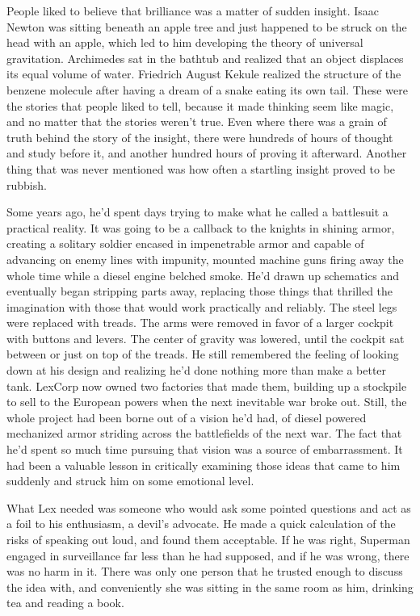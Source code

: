 \documentclass[ebook,12pt]{memoir}
\begin{document}
People liked to believe that brilliance was a matter of sudden insight.
Isaac Newton was sitting beneath an apple tree and just happened to be
struck on the head with an apple, which led to him developing the theory
of universal gravitation. Archimedes sat in the bathtub and realized
that an object displaces its equal volume of water. Friedrich August
Kekule realized the structure of the benzene molecule after having a
dream of a snake eating its own tail. These were the stories that people
liked to tell, because it made thinking seem like magic, and no matter
that the stories weren't true. Even where there was a grain of truth
behind the story of the insight, there were hundreds of hours of thought
and study before it, and another hundred hours of proving it afterward.
Another thing that was never mentioned was how often a startling insight
proved to be rubbish.

Some years ago, he'd spent days trying to make what he called a
battlesuit a practical reality. It was going to be a callback to the
knights in shining armor, creating a solitary soldier encased in
impenetrable armor and capable of advancing on enemy lines with
impunity, mounted machine guns firing away the whole time while a diesel
engine belched smoke. He'd drawn up schematics and eventually began
stripping parts away, replacing those things that thrilled the
imagination with those that would work practically and reliably. The
steel legs were replaced with treads. The arms were removed in favor of
a larger cockpit with buttons and levers. The center of gravity was
lowered, until the cockpit sat between or just on top of the treads. He
still remembered the feeling of looking down at his design and realizing
he'd done nothing more than make a better tank. LexCorp now owned two
factories that made them, building up a stockpile to sell to the
European powers when the next inevitable war broke out. Still, the whole
project had been borne out of a vision he'd had, of diesel powered
mechanized armor striding across the battlefields of the next war. The
fact that he'd spent so much time pursuing that vision was a source of
embarrassment. It had been a valuable lesson in critically examining
those ideas that came to him suddenly and struck him on some emotional
level.

What Lex needed was someone who would ask some pointed questions and act
as a foil to his enthusiasm, a devil's advocate. He made a quick
calculation of the risks of speaking out loud, and found them
acceptable. If he was right, Superman engaged in surveillance far less
than he had supposed, and if he was wrong, there was no harm in it.
There was only one person that he trusted enough to discuss the idea
with, and conveniently she was sitting in the same room as him, drinking
tea and reading a book.
\end{document}
